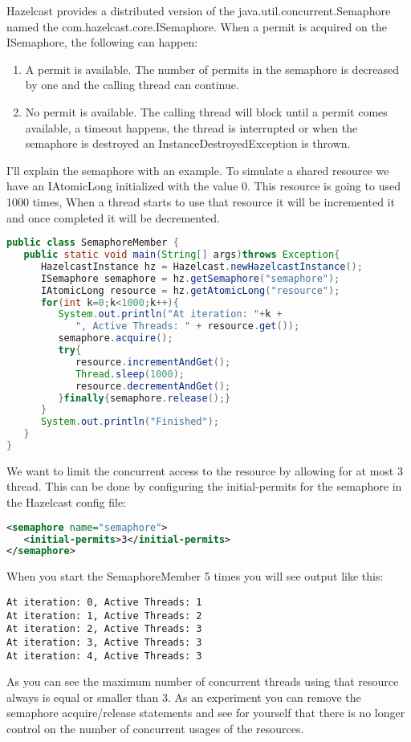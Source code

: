 Hazelcast provides a distributed version of the java.util.concurrent.Semaphore named the com.hazelcast.core.ISemaphore. When a permit is acquired on the ISemaphore, the following can happen:
\begin{enumerate}
\item A permit is available. The number of permits in the semaphore is decreased by one and the calling thread can continue. 
\item No permit is available. The calling thread will block until a permit comes available, a timeout happens, the thread is interrupted or when the semaphore is destroyed an InstanceDestroyedException is thrown.
\end{enumerate}
I'll explain the semaphore with an example. To simulate a shared resource we have an IAtomicLong initialized with the value 0. This resource is going to used 1000 times, When a thread starts to use that resource it will be incremented it and once completed it will be decremented.
\begin{lstlisting}[language=java]
public class SemaphoreMember {
   public static void main(String[] args)throws Exception{
      HazelcastInstance hz = Hazelcast.newHazelcastInstance();
      ISemaphore semaphore = hz.getSemaphore("semaphore");
      IAtomicLong resource = hz.getAtomicLong("resource");
      for(int k=0;k<1000;k++){
         System.out.println("At iteration: "+k +
            ", Active Threads: " + resource.get());
         semaphore.acquire();
         try{
            resource.incrementAndGet();
            Thread.sleep(1000);
            resource.decrementAndGet();
         }finally{semaphore.release();}
      }
      System.out.println("Finished");
   }
}
\end{lstlisting}
We want to limit the concurrent access to the resource by allowing for at most 3 thread. This can be done by configuring the initial-permits for the semaphore in the Hazelcast config file:
\begin{lstlisting}[language=xml]
<semaphore name="semaphore">
   <initial-permits>3</initial-permits>
</semaphore>
\end{lstlisting}
When you start the SemaphoreMember 5 times you will see output like this:
\begin{lstlisting}
At iteration: 0, Active Threads: 1
At iteration: 1, Active Threads: 2
At iteration: 2, Active Threads: 3
At iteration: 3, Active Threads: 3
At iteration: 4, Active Threads: 3
\end{lstlisting}
As you can see the maximum number of concurrent threads using that resource always is equal or smaller than 3. As an experiment you can remove the semaphore acquire/release statements and see for yourself that there is no longer control on the number of concurrent usages of the resources.


